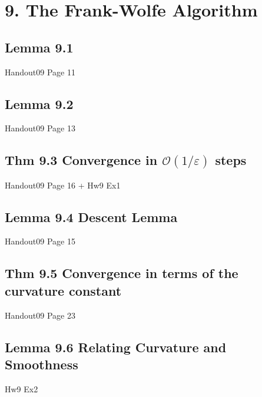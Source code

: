 \section*{9. The Frank-Wolfe Algorithm}
\subsection*{Lemma 9.1}
Handout09 Page 11


\subsection*{Lemma 9.2}
Handout09 Page 13


\subsection*{Thm 9.3 Convergence in $\mathcal{O}(1 / \varepsilon)$ steps}
Handout09 Page 16 + Hw9 Ex1


\subsection*{Lemma 9.4 Descent Lemma}
Handout09 Page 15


\subsection*{Thm 9.5 Convergence in terms of the curvature constant}
Handout09 Page 23


\subsection*{Lemma 9.6 Relating Curvature and Smoothness}
Hw9 Ex2